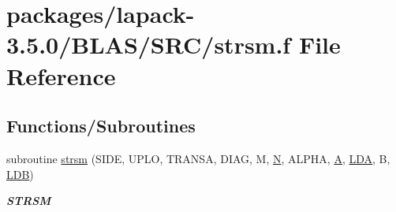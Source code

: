 \hypertarget{lapack-3_85_80_2BLAS_2SRC_2strsm_8f}{}\section{packages/lapack-\/3.5.0/\+B\+L\+A\+S/\+S\+R\+C/strsm.f File Reference}
\label{lapack-3_85_80_2BLAS_2SRC_2strsm_8f}
\subsection*{Functions/\+Subroutines}
\begin{DoxyCompactItemize}
\item 
subroutine \hyperlink{group__single__blas__level3_ga9893cceb3ffc7ce400eee405970191b3}{strsm} (S\+I\+D\+E, U\+P\+L\+O, T\+R\+A\+N\+S\+A, D\+I\+A\+G, M, \hyperlink{polmisc_8c_a0240ac851181b84ac374872dc5434ee4}{N}, A\+L\+P\+H\+A, \hyperlink{classA}{A}, \hyperlink{example__user_8c_ae946da542ce0db94dced19b2ecefd1aa}{L\+D\+A}, B, \hyperlink{example__user_8c_a50e90a7104df172b5a89a06c47fcca04}{L\+D\+B})
\begin{DoxyCompactList}\small\item\em {\bfseries S\+T\+R\+S\+M} \end{DoxyCompactList}\end{DoxyCompactItemize}
